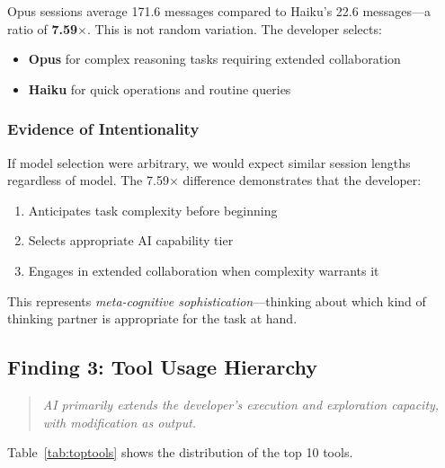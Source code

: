 Opus sessions average 171.6 messages compared to Haiku's 22.6 messages---a ratio of \textbf{7.59$\times$}. This is not random variation. The developer selects:
\begin{itemize}
    \item \textbf{Opus} for complex reasoning tasks requiring extended collaboration
    \item \textbf{Haiku} for quick operations and routine queries
\end{itemize}

\subsubsection{Evidence of Intentionality}

If model selection were arbitrary, we would expect similar session lengths regardless of model. The 7.59$\times$ difference demonstrates that the developer:
\begin{enumerate}
    \item Anticipates task complexity before beginning
    \item Selects appropriate AI capability tier
    \item Engages in extended collaboration when complexity warrants it
\end{enumerate}

This represents \textit{meta-cognitive sophistication}---thinking about which kind of thinking partner is appropriate for the task at hand.

\subsection{Finding 3: Tool Usage Hierarchy}

\begin{quote}
\textit{AI primarily extends the developer's execution and exploration capacity, with modification as output.}
\end{quote}

Table~\ref{tab:toptools} shows the distribution of the top 10 tools.

